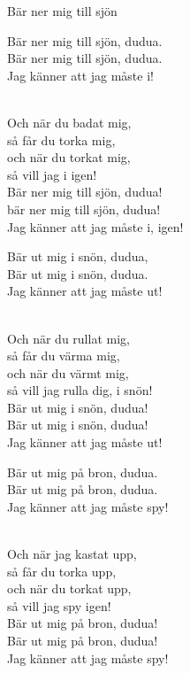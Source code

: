\begin{song}{Bär ner mig till sjön}
	


    \showversenumber	
	\begin{repetition}
		Bär ner mig till sjön, dudua.\\
		Bär ner mig till sjön, dudua.\\
		Jag känner att jag måste i!
	\end{repetition}\\
	Och när du badat mig,\\
	så får du torka mig,\\
	och när du torkat mig,\\
	så vill jag i igen!\\
	Bär ner mig till sjön, dudua!\\
	bär ner mig till sjön, dudua!\\
	Jag känner att jag måste i, igen!
	
    \showversenumber
	\begin{repetition}
		Bär ut mig i snön, dudua,\\
		Bär ut mig i snön, dudua.\\
		Jag känner att jag måste ut!
	\end{repetition}\\
	Och när du rullat mig,\\
	så får du värma mig,\\
	och när du värmt mig,\\
	så vill jag rulla dig, i snön!\\
	Bär ut mig i snön, dudua!\\
	Bär ut mig i snön, dudua!\\
	Jag känner att jag måste ut!
	
    \showversenumber
	\begin{repetition}
		Bär ut mig på bron, dudua.\\
		Bär ut mig på bron, dudua.\\
		Jag känner att jag måste spy!
	\end{repetition}\\
	Och när jag kastat upp,\\
	så får du torka upp,\\
	och när du torkat upp,\\
	så vill jag spy igen!\\
	Bär ut mig på bron, dudua!\\
	Bär ut mig på bron, dudua!\\
	Jag känner att jag måste spy!
	

\end{song}
